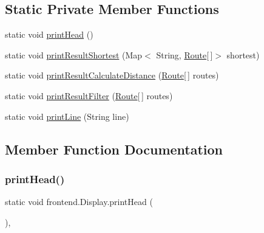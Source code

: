 \subsection*{Static Private Member Functions}
\begin{DoxyCompactItemize}
\item 
static void \hyperlink{classfrontend_1_1_display_a6704fd4ef43902afcf1bd072acc5dc71}{print\+Head} ()
\item 
static void \hyperlink{classfrontend_1_1_display_ab2cef6740e59b37091b0215cf82a12f8}{print\+Result\+Shortest} (Map$<$ String, \hyperlink{classdomain_1_1_route}{Route}\mbox{[}$\,$\mbox{]}$>$ shortest)
\item 
static void \hyperlink{classfrontend_1_1_display_a891f43b99b7c9ff439b8eb0544774f48}{print\+Result\+Calculate\+Distance} (\hyperlink{classdomain_1_1_route}{Route}\mbox{[}$\,$\mbox{]} routes)
\item 
static void \hyperlink{classfrontend_1_1_display_a7480b033057115a5237b26915b52bbf4}{print\+Result\+Filter} (\hyperlink{classdomain_1_1_route}{Route}\mbox{[}$\,$\mbox{]} routes)
\item 
static void \hyperlink{classfrontend_1_1_display_a193f8320f4b5d03906180bed773b8f52}{print\+Line} (String line)
\end{DoxyCompactItemize}


\subsection{Member Function Documentation}
\mbox{\label{classfrontend_1_1_display_a6704fd4ef43902afcf1bd072acc5dc71}} 
\subsubsection{\texorpdfstring{print\+Head()}{printHead()}}
{\footnotesize\ttfamily static void frontend.\+Display.\+print\+Head (\begin{DoxyParamCaption}{ }\end{DoxyParamCaption})\hspace{0.3cm}{\ttfamily [static]}, {\ttfamily [private]}}


